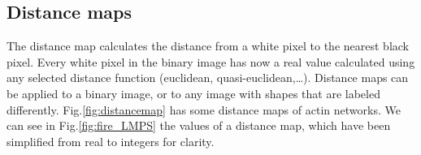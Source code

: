 \subsection{Distance maps}

The distance map calculates the distance from a
white pixel to the nearest black pixel. Every white pixel in the binary image
has now a real value calculated using any selected distance function (euclidean,
quasi-euclidean,\ldots ). Distance maps can be applied to a binary image, or to
any image with shapes that are labeled differently.
Fig.\ref{fig:distancemap} has some distance maps of actin networks.
We can see in Fig.\ref{fig:fire_LMPS} the values of a distance map, which have
been simplified from real to integers for clarity.
 
 
\begin{figure}[h]

\begin{minipage}{0.5\textwidth}
\\
\hspace{1pt}


\end{minipage}
\end{figure}
